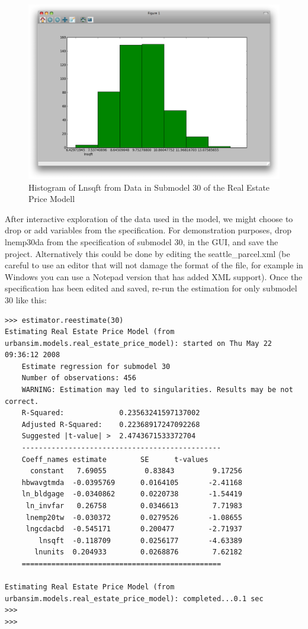 \begin{figure}[htp]
\begin{center}
\includegraphics[scale=0.35]{graphics/histogram-lnsqft.png}
\end{center}
\caption{Histogram of Lnsqft from Data in Submodel 30 of the Real Estate Price Modell}
\label{fig:histogram-lnsqft}
\end{figure}


After interactive exploration of the data used in the model, we might choose to drop or add variables from the specification.  For demonstration purposes, drop lnemp30da from the specification of submodel 30, in the GUI, and save the project.  Alternatively this could be done by editing the seattle\_parcel.xml (be careful to use an editor that will not damage the format of the file, for example in Windows you can use a Notepad version that has added XML support). Once the specification has been edited and saved, re-run the estimation for only submodel 30 like this:\\


\begin{lstlisting}
>>> estimator.reestimate(30)
Estimating Real Estate Price Model (from urbansim.models.real_estate_price_model): started on Thu May 22 09:36:12 2008
    Estimate regression for submodel 30
    Number of observations: 456
    WARNING: Estimation may led to singularities. Results may be not correct.
    R-Squared:             0.23563241597137002
    Adjusted R-Squared:    0.22368917247092268
    Suggested |t-value| >  2.4743671533372704
    -----------------------------------------------
    Coeff_names estimate        SE      t-values
      constant   7.69055         0.83843         9.17256
    hbwavgtmda  -0.0395769      0.0164105       -2.41168
    ln_bldgage  -0.0340862      0.0220738       -1.54419
     ln_invfar   0.26758        0.0346613        7.71983
     lnemp20tw  -0.030372       0.0279526       -1.08655
     lngcdacbd  -0.545171       0.200477        -2.71937
        lnsqft  -0.118709       0.0256177       -4.63389
       lnunits  0.204933        0.0268876        7.62182
    ===============================================

Estimating Real Estate Price Model (from urbansim.models.real_estate_price_model): completed...0.1 sec
>>> 
>>>
\end{lstlisting}

